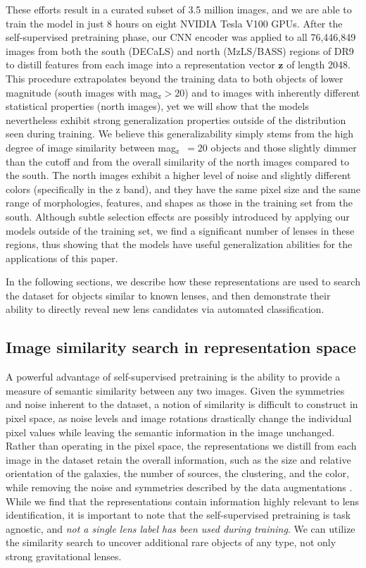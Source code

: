 \documentclass{aastex631}
\newcommand{\zmag}{mag$_{\mathrm{z}}$}
\begin{document}
These efforts result in a curated subset of 3.5 million images, and we are able to train the model in just 8 hours on eight NVIDIA Tesla V100 GPUs. After the self-supervised pretraining phase, our CNN encoder was applied to all 76,446,849 images from both the south (DECaLS) and north (MzLS/BASS) regions of DR9 to distill features from each image into a representation vector $\mathbf{z}$ of length 2048. This procedure extrapolates beyond the training data to both objects of lower magnitude (south images with \zmag $>20$) and to images with inherently different statistical properties (north images), yet we will show that the models nevertheless exhibit strong generalization properties outside of the distribution seen during training. We believe this generalizability simply stems from the high degree of image similarity between \zmag~$=20$ objects and those slightly dimmer than the cutoff and from the overall similarity of the north images compared to the south. The north images exhibit a higher level of noise and slightly different colors (specifically in the z band), and they have the same pixel size and the same range of morphologies, features, and shapes as those in the training set from the south. Although subtle selection effects are possibly introduced by applying our models outside of the training set, we find a significant number of lenses in these regions, thus showing that the models have useful generalization abilities for the applications of this paper.    

In the following sections, we describe how these representations are used to search the dataset for objects similar to known lenses, and then demonstrate their ability to directly reveal new lens candidates via automated classification.


\subsection{Image similarity search in representation space}

A powerful advantage of self-supervised pretraining is the ability to provide a measure of semantic similarity between any two images. Given the symmetries and noise inherent to the dataset, a notion of similarity is difficult to construct in pixel space, as noise levels and image rotations drastically change the individual pixel values while leaving the semantic information in the image unchanged. Rather than operating in the pixel space, the representations we distill from each image in the dataset retain the overall information, such as the size and relative orientation of the galaxies, the number of sources, the clustering, and the color, while removing the noise and symmetries described by the data augmentations \citep[for a visualization of how galaxy properties are organized in the representation space of a self-supervised model, see][]{Hayat_2021}. While we find that the representations contain information highly relevant to lens identification, it is important to note that the self-supervised pretraining is task agnostic, and {\textit{not a single lens label has been used during training}}. We can utilize the similarity search to uncover additional rare objects of any type, not only strong gravitational lenses.  
\end{document}
